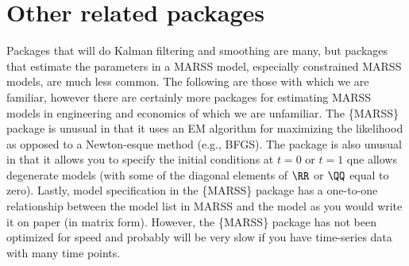\section{Other related packages}
Packages that will do Kalman filtering and smoothing are many, but packages that estimate the parameters in a MARSS model, especially constrained MARSS models, are much less common.  The following are those with which we are familiar, however there are certainly more packages for estimating MARSS models in engineering and economics of which we are unfamiliar.  The \{MARSS\} package is unusual in that it uses an EM algorithm for maximizing the likelihood as opposed to a Newton-esque method (e.g., BFGS). The package is also unusual in that it allows you to specify the initial conditions at $t=0$ or $t=1$ qne allows degenerate models (with some of the diagonal elements of $\RR$ or $\QQ$ equal to zero). Lastly, model specification in the \{MARSS\} package  has a one-to-one relationship between the model list in MARSS and the model as you would write it on paper (in matrix form).  However, the \{MARSS\} package has not been optimized for speed and probably will be very slow if you have time-series data with many time points.

